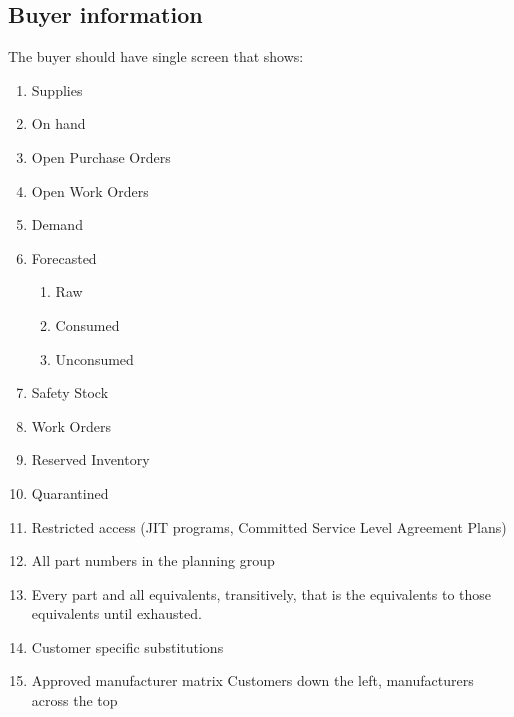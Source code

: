 \documentclass[letterpaper,10pt,english]{sphinxmanual}
\begin{document}
\subsection{Buyer information}
\label{\detokenize{BusinessProcessReengineering:id10}}
The buyer should have single screen that shows:
\begin{enumerate}
%
\item {} 
Supplies

\item {} 
On hand

\item {} 
Open Purchase Orders

\item {} 
Open Work Orders

\item {} 
Demand

\item {} 
Forecasted
\begin{enumerate}
%
\item {} 
Raw

\item {} 
Consumed

\item {} 
Unconsumed

\end{enumerate}

\item {} 
Safety Stock

\item {} 
Work Orders

\item {} 
Reserved Inventory

\item {} 
Quarantined

\item {} 
Restricted access (JIT programs, Committed Service Level Agreement
Plans)

\item {} 
All part numbers in the planning group

\item {} 
Every part and all equivalents, transitively, that is the equivalents
to those equivalents until exhausted.

\item {} 
Customer specific substitutions

\item {} 
Approved manufacturer matrix Customers down the left, manufacturers
across the top


\end{enumerate}
\end{document}
